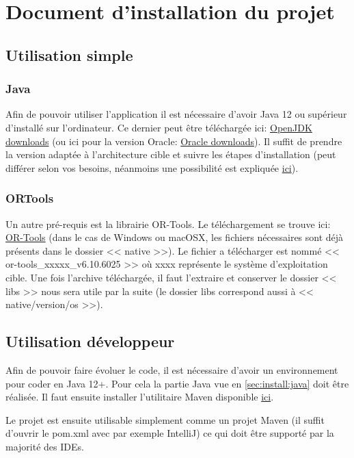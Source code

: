 \documentclass[final]{polytech/polytech}
\begin{document}
\chapter{Document d'installation du projet}
	\section{Utilisation simple}
		\subsection{Java\label{sec:install:java}}
			Afin de pouvoir utiliser l'application il est nécessaire d'avoir Java 12 ou supérieur d'installé sur l'ordinateur.
			Ce dernier peut être téléchargée ici: \href{https://jdk.java.net/}{OpenJDK downloads} (ou ici pour la version Oracle: \href{https://www.oracle.com/technetwork/java/javase/downloads/index.html}{Oracle downloads}).
			Il suffit de prendre la version adaptée à l'architecture cible et suivre les étapes d'installation (peut différer selon vos besoins, néanmoins une possibilité est expliquée \href{https://stackoverflow.com/a/52531093/3281185}{ici}).

		\subsection{ORTools}
			Un autre pré-requis est la librairie OR-Tools.
			Le téléchargement se trouve ici: \href{https://github.com/google/or-tools/releases/tag/v6.10}{OR-Tools} (dans le cas de Windows ou macOSX, les fichiers nécessaires sont déjà présents dans le dossier << native >>).
			Le fichier a télécharger est nommé << or-tools\_xxxxx\_v6.10.6025 >> où xxxx représente le système d'exploitation cible.
			Une fois l'archive téléchargée, il faut l'extraire et conserver le dossier << libs >> nous sera utile par la suite (le dossier libs correspond aussi à << native/version/os >>).

	\section{Utilisation développeur}
		Afin de pouvoir faire évoluer le code, il est nécessaire d'avoir un environnement pour coder en Java 12+.
		Pour cela la partie Java vue en \autoref{sec:install:java} doit être réalisée.
		Il faut ensuite installer l'utilitaire Maven disponible \href{https://maven.apache.org/download.cgi}{ici}.
		
		Le projet est ensuite utilisable simplement comme un projet Maven (il suffit d'ouvrir le pom.xml avec par exemple IntelliJ) ce qui doit être supporté par la majorité des IDEs.
		
\end{document}
